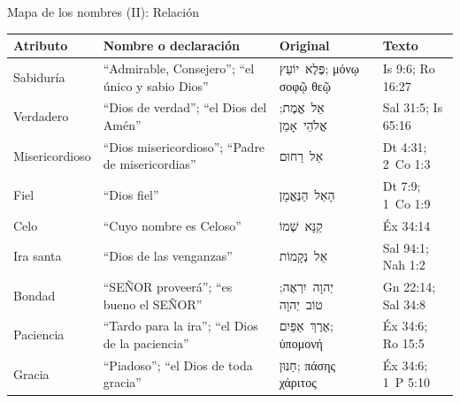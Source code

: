 \documentclass[hyperref={bookmarks=false},aspectratio=169]{beamer}
\newcommand{\heb}[1]{\mbox{\foreignlanguage{hebrew}{#1}}}
\newcommand{\grc}[1]{\foreignlanguage{ancientgreek}{#1}}
\newcommand{\SENOR}{SEÑOR}
\renewcommand{\arraystretch}{1.3}
\begin{document}
\begin{frame}{Mapa de los nombres (II): Relación}
\tiny\renewcommand{\arraystretch}{1.1}
\begin{tabular}{@{}>{\RaggedRight\arraybackslash}p{1.6cm}>{\RaggedRight\arraybackslash}p{3.9cm}>{\RaggedRight\arraybackslash}p{3.1cm}>{\RaggedRight\arraybackslash}p{1.9cm}@{}}
\toprule
\textbf{Atributo} & \textbf{Nombre o declaración} & \textbf{Original} & \textbf{Texto} \\ \midrule
Sabiduría & ``Admirable, Consejero''; ``el único y sabio Dios'' & \heb{פֶּלֶא יוֹעֵץ}; \grc{μόνῳ σοφῷ θεῷ} & Is 9:6; Ro 16:27 \\
Verdadero & ``Dios de verdad''; ``el Dios del Amén'' & \heb{אֵל אֱמֶת}; \heb{אֱלֹהֵי אָמֵן} & Sal 31:5; Is 65:16 \\
Misericordioso & ``Dios misericordioso''; ``Padre de misericordias'' & \heb{אֵל רַחוּם} & Dt 4:31; 2~Co 1:3 \\
Fiel & ``Dios fiel'' & \heb{הָאֵל הַנֶּאֱמָן} & Dt 7:9; 1~Co 1:9 \\
Celo & ``Cuyo nombre es Celoso'' & \heb{קַנָּא שְׁמוֹ} & Éx 34:14 \\
Ira santa & ``Dios de las venganzas'' & \heb{אֵל נְקָמוֹת} & Sal 94:1; Nah 1:2 \\
Bondad & ``\SENOR{} proveerá''; ``es bueno el \SENOR{}'' & \heb{יְהוָה יִרְאֶה}; \heb{טוֹב יְהוָה} & Gn 22:14; Sal 34:8 \\
Paciencia & ``Tardo para la ira''; ``el Dios de la paciencia'' & \heb{אֶרֶךְ אַפַּיִם}; \grc{ὑπομονή} & Éx 34:6; Ro 15:5 \\
Gracia & ``Piadoso''; ``el Dios de toda gracia'' & \heb{חַנּוּן}; \grc{πάσης χάριτος} & Éx 34:6; 1~P 5:10 \\
\bottomrule
\end{tabular}\par\smallskip
{}
\end{frame}
\end{document}
